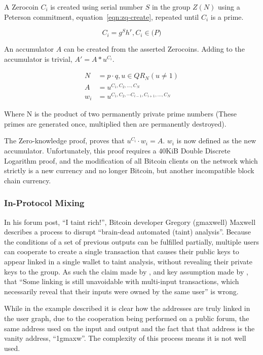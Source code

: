 A Zerocoin $C_{i}$ is created using serial number $S$ in the group $Z(N)$ using a Peterson commitment, equation~\ref{eqn:zq-create}, repeated until $C_i$ is a prime.

\begin{equation}\label{eqn:zq-create}
C_{i}=g^Sh^r, C_i \in \mathbb(P)
\end{equation}

An accumulator $A$ can be created from the asserted Zerocoins.  Adding to the accumulator is trivial, $A' = A*u^{C_i}$.

\begin{subequations}
    \begin{align}\label{eqn:zkp}
        N &= p \cdot q, u \in QR_{N}(u\neq1)\\
        A &= u^{C_1, C_2,\dots,C_N}\\
        w_i &=  u^{C_1, C_2,\cdots C_{i-1}, C_{i+1}, \dots ,C_N}
    \end{align}
\end{subequations}

Where N is the product of two permanently private prime numbers (These primes are generated once, multiplied then are permanently destroyed).

The Zero-knowledge proof, proves that $u^{C_i} \cdot w_i = A$. $w_i$ is now defined as the new accumulator. Unfortunately, this proof requires a 40KiB Double Discrete Logarithm proof, and the modification of all Bitcoin clients on the network which strictly is a new currency and no longer Bitcoin, but another incompatible block chain currency.

\subsubsection{In-Protocol Mixing}
In his forum post, ``I taint rich!'', Bitcoin developer Gregory (gmaxwell) Maxwell describes a process to disrupt ``brain-dead automated (taint) analysis''.  Because the conditions of a set of previous outputs can be fulfilled partially, multiple users can cooperate to create a single transaction that causes their public keys to appear linked in a single wallet to taint analysis, without revealing their private keys to the group.  As such the claim made by \textcite{satoshi}, and key assumption made by \textcite{reid-anon}, that ``Some linking is still unavoidable with multi-input transactions, which necessarily reveal that their inputs were owned by the same user'' is wrong.

While in the example described it is clear how the addresses are truly linked in the user graph, due to the cooperation being performed on a public forum, the same address used on the input and output and the fact that that address is the vanity address, ``1gmaxw''. The complexity of this process means it is not well used.

